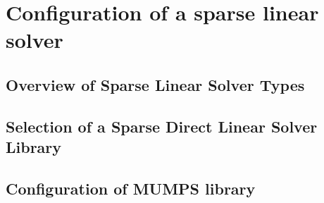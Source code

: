 \chapter{Configuration of a sparse linear solver}

	\section{Overview of Sparse Linear Solver Types}
	

	\section{Selection of a Sparse Direct Linear Solver Library} \label{chapter:solver-selection}
	


	\section{Configuration of MUMPS library} 
	



